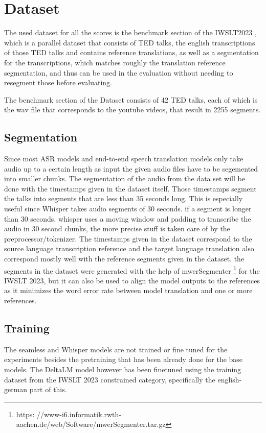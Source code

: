 \section{Dataset}
\label{ch:Dataset}
The used dataset for all the scores is the benchmark section of the IWSLT2023 \cite{sperber2024evaluating}, which is a parallel dataset that consists of TED talks, the english transcriptions of those TED talks and contains reference translations, as well as a segmentation for the transcriptions, which matches roughly the translation reference segmentation, and thus can be used in the evaluation without needing to resegment those before evaluating.

The benchmark section of the Dataset consists of 42 TED talks, each of which is the wav file that corresponds to the youtube videos, that result in 2255 segments. 

\subsection{Segmentation}
\label{sec:FirstContent:Segmentation}
Since most ASR models and end-to-end speech translation models only take audio up to a certain length as input the given audio files have to be segemented into smaller chunks. 
The segmentation of the audio from the data set will be done with the timestamps given in the dataset itself. 
Those timestamps segment the talks into segments that are less than 35 seconds long.
This is especially useful since Whisper takes audio segments of 30 seconds. 
if a segment is longer than 30 seconds, whisper uses a moving window and padding to transcribe the audio in 30 second chunks, the more precise stuff is taken care of by the preprocessor/tokenizer.
The timestamps given in the dataset correspond to the source language transcription reference and the target language translation also correspond mostly well with the reference segments given in the dataset. 
the segments in the dataset were generated with the help of mwerSegmenter \footnote{https:
//www-i6.informatik.rwth-aachen.de/web/Software/mwerSegmenter.tar.gz} for the IWSLT 2023, but it can also be used to align the model outputs to the references as it minimizes the word error rate between model translation and one or more references.

\subsection{Training}
The seamless and Whisper models are not trained or fine tuned for the experiments besides the pretraining that has been already done for the base models. 
The DeltaLM model however has been finetuned using the training dataset from the IWSLT 2023 constrained category, specifically the english-german part of this. 
